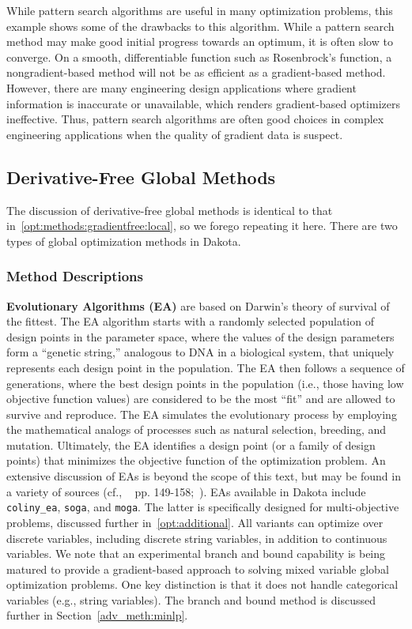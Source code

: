 While pattern search algorithms are useful in many optimization
problems, this example shows some of the drawbacks to this algorithm.
While a pattern search method may make good initial progress towards
an optimum, it is often slow to converge. On a smooth, differentiable
function such as Rosenbrock's function, a nongradient-based method
will not be as efficient as a gradient-based method. However, there
are many engineering design applications where gradient information is
inaccurate or unavailable, which renders gradient-based optimizers
ineffective. Thus, pattern search algorithms are often good choices in
complex engineering applications when the quality of gradient data is
suspect.

\subsection{Derivative-Free Global Methods}
\label{opt:methods:gradientfree:global}

The discussion of derivative-free global methods is identical to that
in~\ref{opt:methods:gradientfree:local}, so we forego repeating it
here.  There are two types of global optimization methods in Dakota.

\subsubsection{Method Descriptions}
\label{opt:methods:gradientfree:global:descriptions}

{\bf Evolutionary Algorithms (EA)} are based on Darwin's theory of
survival of the fittest. The EA algorithm starts with a randomly
selected population of design points in the parameter space, where the
values of the design parameters form a ``genetic string,'' analogous
to DNA in a biological system, that uniquely represents each design
point in the population. The EA then follows a sequence of
generations, where the best design points in the population (i.e.,
those having low objective function values) are considered to be the
most ``fit'' and are allowed to survive and reproduce. The EA
simulates the evolutionary process by employing the mathematical
analogs of processes such as natural selection, breeding, and
mutation. Ultimately, the EA identifies a design point (or a family of
design points) that minimizes the objective function of the
optimization problem. An extensive discussion of EAs is beyond the
scope of this text, but may be found in a variety of sources (cf.,
~\cite{Haf92} pp. 149-158;~\cite{Gol89}). EAs available in Dakota
include \texttt{coliny\_ea}, \texttt{soga}, and \texttt{moga}.  The
latter is specifically designed for multi-objective problems,
discussed further in~\ref{opt:additional}.  All variants can optimize
over discrete variables, including discrete string variables, in
addition to continuous variables.  We note that an experimental branch
and bound capability is being matured to provide a gradient-based
approach to solving mixed variable global optimization problems.  One
key distinction is that it does not handle categorical variables
(e.g., string variables).  The branch and bound method is discussed
further in Section~\ref{adv_meth:minlp}.

